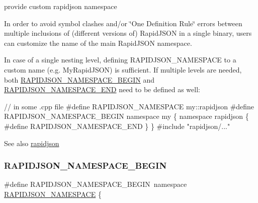 provide custom rapidjson namespace 

In order to avoid symbol clashes and/or \char`\"{}\+One Definition Rule\char`\"{} errors between multiple inclusions of (different versions of) Rapid\+J\+S\+ON in a single binary, users can customize the name of the main Rapid\+J\+S\+ON namespace.

In case of a single nesting level, defining {\ttfamily R\+A\+P\+I\+D\+J\+S\+O\+N\+\_\+\+N\+A\+M\+E\+S\+P\+A\+CE} to a custom name (e.\+g. {\ttfamily My\+Rapid\+J\+S\+ON}) is sufficient. If multiple levels are needed, both \hyperlink{group__RAPIDJSON__CONFIG_gad3806c8251fdc7da9618b7e922674ffc}{R\+A\+P\+I\+D\+J\+S\+O\+N\+\_\+\+N\+A\+M\+E\+S\+P\+A\+C\+E\+\_\+\+B\+E\+G\+IN} and \hyperlink{group__RAPIDJSON__CONFIG_gaf18f052a98b9f5df5448d39484b743c1}{R\+A\+P\+I\+D\+J\+S\+O\+N\+\_\+\+N\+A\+M\+E\+S\+P\+A\+C\+E\+\_\+\+E\+ND} need to be defined as well\+:


\begin{DoxyCode}
\textcolor{comment}{// in some .cpp file}
\textcolor{preprocessor}{#define RAPIDJSON\_NAMESPACE my::rapidjson}
\textcolor{preprocessor}{#define RAPIDJSON\_NAMESPACE\_BEGIN namespace my \{ namespace rapidjson \{}
\textcolor{preprocessor}{#define RAPIDJSON\_NAMESPACE\_END   \} \}}
\textcolor{preprocessor}{#include "rapidjson/..."}
\end{DoxyCode}


\begin{DoxySeeAlso}{See also}
\hyperlink{namespacerapidjson}{rapidjson} 
\end{DoxySeeAlso}
\mbox{\label{group__RAPIDJSON__CONFIG_gad3806c8251fdc7da9618b7e922674ffc}} 
\subsubsection{\texorpdfstring{R\+A\+P\+I\+D\+J\+S\+O\+N\+\_\+\+N\+A\+M\+E\+S\+P\+A\+C\+E\+\_\+\+B\+E\+G\+IN}{RAPIDJSON\_NAMESPACE\_BEGIN}}
{\footnotesize\ttfamily \#define R\+A\+P\+I\+D\+J\+S\+O\+N\+\_\+\+N\+A\+M\+E\+S\+P\+A\+C\+E\+\_\+\+B\+E\+G\+IN~namespace \hyperlink{group__RAPIDJSON__CONFIG_ga743a79d3af927391fe3eb5c979136899}{R\+A\+P\+I\+D\+J\+S\+O\+N\+\_\+\+N\+A\+M\+E\+S\+P\+A\+CE} \{}




